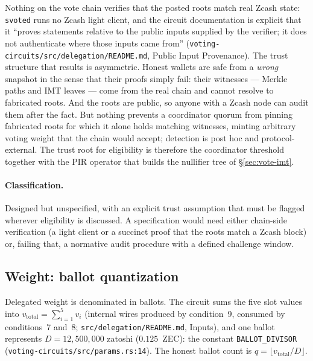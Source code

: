 \documentclass[11pt,a4paper]{article}
\theoremstyle{definition}
\begin{document}
Nothing on the vote chain verifies that the posted roots match real Zcash
state: \texttt{svoted} runs no Zcash light client, and the circuit
documentation is explicit that it ``proves statements relative to the
public inputs supplied by the verifier; it does not authenticate where
those inputs came from''
(\texttt{voting-circuits/src/delegation/README.md}, Public Input
Provenance). The trust structure that results is asymmetric. Honest
wallets are safe from a \emph{wrong} snapshot in the sense that their
proofs simply fail: their witnesses --- Merkle paths and IMT leaves ---
come from the real chain and cannot resolve to fabricated roots. And the
roots are public, so anyone with a Zcash node can audit them after the
fact. But nothing prevents a coordinator quorum from pinning fabricated
roots for which it alone holds matching witnesses, minting arbitrary
voting weight that the chain would accept; detection is post hoc and
protocol-external. The trust root for eligibility is therefore the
coordinator threshold together with the PIR operator that builds the
nullifier tree of \S\ref{sec:vote-imt}.

\paragraph{Classification.} Designed but unspecified, with an explicit
trust assumption that must be flagged wherever eligibility is discussed. A
specification would need either chain-side verification (a light client or
a succinct proof that the roots match a Zcash block) or, failing that, a
normative audit procedure with a defined challenge window.

\subsection{Weight: ballot quantization}\label{sec:vote-weight}

Delegated weight is denominated in ballots. The circuit sums the five slot
values into $v_{\mathrm{total}} = \sum_{i=1}^{5} v_i$ (internal wires
produced by condition~9, consumed by conditions~7 and~8;
\texttt{src/\allowbreak delegation/\allowbreak README.md}, Inputs), and
one ballot represents
$D = 12{,}500{,}000$ zatoshi ($0.125$~ZEC): the constant
\texttt{BALLOT\_DIVISOR} (\texttt{voting-circuits/src/params.rs:14}). The
honest ballot count is $q = \lfloor v_{\mathrm{total}} / D \rfloor$.
\end{document}
